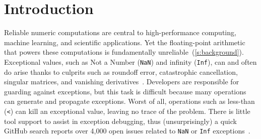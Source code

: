 \documentclass{juliacon}
\begin{document}
\setlength{\parindent}{10pt}


\maketitle

\begin{abstract}
  Reliable numerical computations are central to scientific computing,
  but the floating-point arithmetic that enables large-scale models
  is error-prone.
  Numeric exceptions are a common occurrence and can propagate through
  code, leading to flawed results.
  This paper presents FlowFPX, a toolkit for systematically debugging
  floating-point exceptions by recording their flow,
  coalescing exception contexts, and fuzzing in select locations.
  These tools help scientists discover when exceptions happen
  and track down their origin, smoothing the way to a reliable codebase.
\end{abstract}

\newcommand{\code}[1]{\texttt{#1}}
\newcommand{\FlowFPX}{FlowFPX}
\newcommand{\GPUFPX}{GPU-FPX}
\newcommand{\FloatTracker}{FloatTracker}
\newcommand{\FT}{\FloatTracker}
\newcommand{\Fp}{Floating-point} %
\newcommand{\fp}{floating-point} %
\newcommand{\CSTG}{stack graph}
\newcommand{\CPP}{\code{C++}}
\newcommand{\Dendro}{\textsc{Dendro}}
\newcommand{\urlaccess}[2]{\url{#1}}
\newcommand{\Nan}{\code{NaN}}
\newcommand{\NaN}{\Nan}
\newcommand{\Inf}{\code{Inf}}
\newcommand{\zerowidth}[1]{\makebox[0pt][l]{#1}}
\newcommand{\zerocode}[1]{\zerowidth{\code{#1}}}
\newcommand{\genpropkill}{\emph{gen}-\emph{prop}-\emph{kill}}
\newcommand{\bigcheckmark}{\ding{51}}
\newcommand{\bigxmark}{\ding{53}}
\newcommand{\tblnext}{\(\Rightarrow\)}
\newcommand{\tblY}{\mbox{\bigcheckmark}}
\newcommand{\tblN}{\scalebox{0.8}{\bigxmark}}

\section{Introduction}

Reliable numeric computations are central to high-performance computing,
machine learning, and scientific applications.
Yet the \fp{} arithmetic that powers these computations is fundamentally
unreliable~(\cref{s:background}).
Exceptional values, such as Not a Number (\Nan{}) and infinity (\Inf{}),
can and often do arise thanks to culprits such as roundoff error,
catastrophic cancellation, singular matrices, and vanishing
derivatives~\cite{sdjmrstp-pc-2022,ddghlllprr-correctness-2022,gllprt-correctness-2021,fpchecker-reports,llg-soap-2022,bllmg-xloop-2022}.
Developers are responsible for guarding against exceptions, but this task
is difficult because many operations can generate and propagate exceptions.
Worst of all, operations such as less-than (\code{<}) can kill an exceptional value,
leaving no trace of the problem.
There is little tool support to assist in exception debugging,
thus (unsurprisingly) a quick GitHub search reports over 4,000 open issues
related to \NaN{} or \Inf{} exceptions~\cite{github-issues}.
\end{document}
